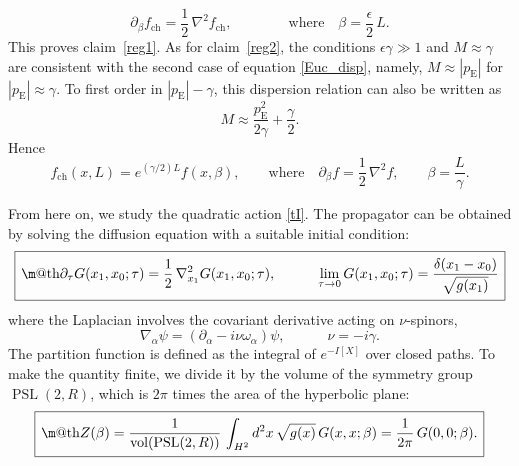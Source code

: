 \documentclass[11pt]{article}
\makeatletter
\newcommand*{\wideboxed}[1]{\setlength{\fboxsep}{1ex}%
  \fbox{\m@th$\displaystyle#1$}}
\newcommand{\RR}{\mathbb{R}}
\DeclareMathOperator{\PSL}{PSL}
\DeclareMathOperator{\HH}{H}
\newcommand{\ch}{\text{ch}}
\newcommand{\Euc}{\mathrm{E}}
\def\HH{H}
\def\RR{R}
\makeatother
\begin{document}
\begin{equation}
\partial_{\beta}f_{\ch}=\frac{1}{2}\,\nabla^2f_{\ch},\qquad\qquad
\text{where}\quad
\beta=\frac{\epsilon}{2}\,L.
\end{equation}
This proves claim~\ref{reg1}. As for claim~\ref{reg2}, the conditions $\epsilon\gamma\gg 1$ and $M\approx\gamma$ are consistent with the second case of equation \eqref{Euc_disp}, namely, $M\approx|p_{\Euc}|$ for $|p_{\Euc}|\approx\gamma$. To first order in $|p_{\Euc}|-\gamma$, this dispersion relation can also be written as
\begin{equation}
M\approx \frac{p_{\Euc}^2}{2\gamma}+\frac{\gamma}{2}.
\end{equation}
Hence
\begin{equation}
f_{\ch}(x,L)=e^{(\gamma/2)L}f(x,\beta),\qquad
\text{where}\quad
\partial_{\beta}f=\frac{1}{2}\,\nabla^2f,\qquad
\beta=\frac{L}{\gamma}.
\end{equation}

From here on, we study the quadratic action \eqref{tI}. The propagator can be obtained by solving the diffusion equation with a suitable initial condition:
\begin{equation}\label{diffusion}
\wideboxed{
\partial_{\tau}G(x_1,x_0;\tau)=\frac{1}{2}\,\nabla_{x_1}^{2}G(x_1,x_0;\tau),
\qquad\quad
\lim_{\tau\to 0}G(x_1,x_0;\tau)=\frac{\delta(x_1-x_0)}{\sqrt{g(x_1)}}
}
\end{equation}
where the Laplacian involves the covariant derivative acting on $\nu$-spinors,
\begin{equation} \label{coder}
\nabla_{\alpha}\psi
=(\partial_{\alpha}-i\nu\omega_{\alpha})\psi,\qquad\quad
\nu=-i\gamma.
\end{equation}
The partition function is defined as the integral of $e^{-I[X]}$ over closed paths. To make the quantity finite, we divide it by the volume of the symmetry group $\PSL(2,\RR)$, which is $2\pi$ times the area of the hyperbolic plane:
\begin{equation} \label{Zdef}
\wideboxed{
Z(\beta)=\frac{1}{\operatorname{vol}(\PSL(2,\RR))}\,
\int_{\HH^2}d^2x\,\sqrt{g(x)}\,G(x,x;\beta)
=\frac{1}{2\pi}\,G(0,0;\beta).
}
\end{equation}
\end{document}
